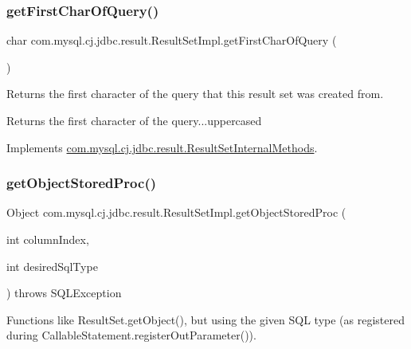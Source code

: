 \subsubsection{\texorpdfstring{get\+First\+Char\+Of\+Query()}{getFirstCharOfQuery()}}
{\footnotesize\ttfamily char com.\+mysql.\+cj.\+jdbc.\+result.\+Result\+Set\+Impl.\+get\+First\+Char\+Of\+Query (\begin{DoxyParamCaption}{ }\end{DoxyParamCaption})}

Returns the first character of the query that this result set was created from.

\begin{DoxyReturn}{Returns}
the first character of the query...uppercased 
\end{DoxyReturn}


Implements \mbox{\hyperlink{interfacecom_1_1mysql_1_1cj_1_1jdbc_1_1result_1_1_result_set_internal_methods_ab58d42f08a9145dcff574389fcb697ff}{com.\+mysql.\+cj.\+jdbc.\+result.\+Result\+Set\+Internal\+Methods}}.

\mbox{\label{classcom_1_1mysql_1_1cj_1_1jdbc_1_1result_1_1_result_set_impl_a3dfdc0ed2f2b5498834ffbf5a0269e1a}} 
\subsubsection{\texorpdfstring{get\+Object\+Stored\+Proc()}{getObjectStoredProc()}\hspace{0.1cm}{\footnotesize\ttfamily [1/4]}}
{\footnotesize\ttfamily Object com.\+mysql.\+cj.\+jdbc.\+result.\+Result\+Set\+Impl.\+get\+Object\+Stored\+Proc (\begin{DoxyParamCaption}\item[{int}]{column\+Index,  }\item[{int}]{desired\+Sql\+Type }\end{DoxyParamCaption}) throws S\+Q\+L\+Exception}

Functions like Result\+Set.\+get\+Object(), but using the given S\+QL type (as registered during Callable\+Statement.\+register\+Out\+Parameter()).


